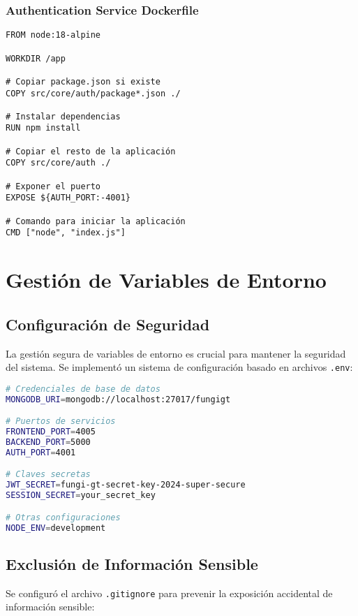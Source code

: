 \documentclass[12pt,a4paper]{article}
\begin{document}
\subsubsection{Authentication Service Dockerfile}

\begin{lstlisting}[language=docker, caption=Dockerfile para el servicio de autenticación]
FROM node:18-alpine

WORKDIR /app

# Copiar package.json si existe
COPY src/core/auth/package*.json ./

# Instalar dependencias
RUN npm install

# Copiar el resto de la aplicación
COPY src/core/auth ./

# Exponer el puerto
EXPOSE ${AUTH_PORT:-4001}

# Comando para iniciar la aplicación
CMD ["node", "index.js"]
\end{lstlisting}

\section{Gestión de Variables de Entorno}

\subsection{Configuración de Seguridad}

La gestión segura de variables de entorno es crucial para mantener la seguridad del sistema. Se implementó un sistema de configuración basado en archivos \texttt{.env}:

\begin{lstlisting}[language=bash, caption=Ejemplo de archivo .env]
# Credenciales de base de datos
MONGODB_URI=mongodb://localhost:27017/fungigt

# Puertos de servicios
FRONTEND_PORT=4005
BACKEND_PORT=5000
AUTH_PORT=4001

# Claves secretas
JWT_SECRET=fungi-gt-secret-key-2024-super-secure
SESSION_SECRET=your_secret_key

# Otras configuraciones
NODE_ENV=development
\end{lstlisting}

\subsection{Exclusión de Información Sensible}

Se configuró el archivo \texttt{.gitignore} para prevenir la exposición accidental de información sensible:
\end{document}
